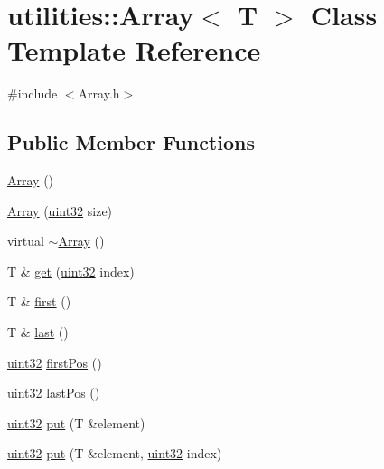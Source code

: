\hypertarget{classutilities_1_1Array}{
\section{utilities::Array$<$ T $>$ Class Template Reference}
\label{classutilities_1_1Array}
}


{\ttfamily \#include $<$Array.h$>$}

\subsection*{Public Member Functions}
\begin{DoxyCompactItemize}
\item 
\hyperlink{classutilities_1_1Array_a36ea069b42679efcfa85315814037845}{Array} ()
\item 
\hyperlink{classutilities_1_1Array_a1d2796509cf762943acda6928bad0105}{Array} (\hyperlink{namespacecompatibility_a51e8fe2956b4f39fe1fae96cec0d8393}{uint32} size)
\item 
virtual \hyperlink{classutilities_1_1Array_a2044f11af57ed32ffd7c32859b8a422a}{$\sim$Array} ()
\item 
T \& \hyperlink{classutilities_1_1Array_a7a950f93d6aa81c728dc4077fc1ca229}{get} (\hyperlink{namespacecompatibility_a51e8fe2956b4f39fe1fae96cec0d8393}{uint32} index)
\item 
T \& \hyperlink{classutilities_1_1Array_ae6ce076bb8eeda8a4b47be804144b931}{first} ()
\item 
T \& \hyperlink{classutilities_1_1Array_a8195132a3d87ca22dd85835779c2004d}{last} ()
\item 
\hyperlink{namespacecompatibility_a51e8fe2956b4f39fe1fae96cec0d8393}{uint32} \hyperlink{classutilities_1_1Array_a70ae221403b021a5153e98b6ca462fe3}{firstPos} ()
\item 
\hyperlink{namespacecompatibility_a51e8fe2956b4f39fe1fae96cec0d8393}{uint32} \hyperlink{classutilities_1_1Array_aeb02289c0b7abb4e05804c4bbd6dad50}{lastPos} ()
\item 
\hyperlink{namespacecompatibility_a51e8fe2956b4f39fe1fae96cec0d8393}{uint32} \hyperlink{classutilities_1_1Array_aa22c59e159ed1231c4259fef00c516ba}{put} (T \&element)
\item 
\hyperlink{namespacecompatibility_a51e8fe2956b4f39fe1fae96cec0d8393}{uint32} \hyperlink{classutilities_1_1Array_a03c2f682efc6ddb4a9335b6705074411}{put} (T \&element, \hyperlink{namespacecompatibility_a51e8fe2956b4f39fe1fae96cec0d8393}{uint32} index)
\item 

\end{DoxyCompactItemize}
